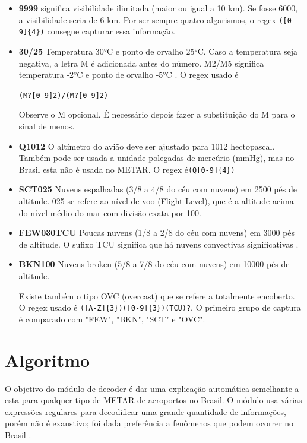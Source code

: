 \begin{itemize}
\item \textbf{9999} significa visibilidade ilimitada (maior ou igual a 10 km). Se fosse 
6000, a visibilidade seria de 
6 km. Por ser sempre quatro algarismos, o regex \verb|([0-9]{4})| consegue capturar 
essa informação.

\item \textbf{30/25} Temperatura 30°C e ponto de orvalho 25°C. Caso a temperatura seja 
negativa, a letra M é adicionada antes do número. M2/M5 significa temperatura 
-2°C e ponto de orvalho -5°C \cite{METAR-help}. O regex usado é

\texttt{(M?[0-9]{2})/(M?[0-9]{2})}

Observe o M opcional. É necessário depois fazer a substituição do M para o sinal
de menos.

\item \textbf{Q1012} O altímetro do avião deve ser ajustado para 1012 hectopascal. 
Também pode ser usada a unidade polegadas de mercúrio (mmHg), mas no Brasil esta 
não é usada no METAR. O regex é\verb|(Q[0-9]{4})|

\item \textbf{SCT025} Nuvens espalhadas (3/8 a 4/8 do céu com nuvens) em 2500 pés de 
altitude. 025 se refere ao nível de voo (Flight Level), que é a altitude acima 
do nível médio do mar com divisão exata por 100.

\item \textbf{FEW030TCU} Poucas nuvens (1/8 a 2/8 do céu com nuvens) em 3000 pés de 
altitude. O sufixo TCU significa que há nuvens convectivas significativas \cite{decea-mil}.

\item \textbf{BKN100} Nuvens broken (5/8 a 7/8 do céu com nuvens) em 10000 pés de altitude.

Existe também o tipo OVC (overcast) que se refere a totalmente encoberto. O regex 
usado é \verb|([A-Z]{3})([0-9]{3})(TCU)?|. O primeiro grupo de captura é comparado 
com "FEW", "BKN", "SCT" e "OVC".

\end{itemize}

\section{Algoritmo}

O objetivo do módulo de decoder é dar uma explicação automática semelhante a esta 
para qualquer tipo de METAR de aeroportos no Brasil. O módulo usa várias expressões 
regulares para decodificar uma grande quantidade de informações, porém não é exaustivo; 
foi dada preferência a fenômenos que podem ocorrer no Brasil \cite{decea-mil}.

